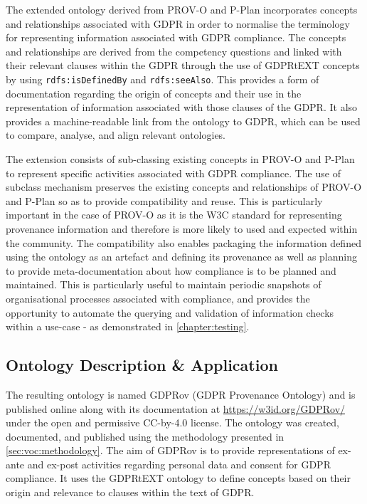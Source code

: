 The extended ontology derived from PROV-O and P-Plan incorporates concepts and relationships associated with GDPR in order to normalise the terminology for representing information associated with GDPR compliance.
The concepts and relationships are derived from the competency questions and linked with their relevant clauses within the GDPR through the use of GDPRtEXT concepts by using \texttt{rdfs:isDefinedBy} and \texttt{rdfs:seeAlso}.
This provides a form of documentation regarding the origin of concepts and their use in the representation of information associated with those clauses of the GDPR.
It also provides a machine-readable link from the ontology to GDPR, which can be used to compare, analyse, and align relevant ontologies.

The extension consists of sub-classing existing concepts in PROV-O and P-Plan to represent specific activities associated with GDPR compliance. 
The use of subclass mechanism preserves the existing concepts and relationships of PROV-O and P-Plan so as to provide compatibility and reuse. This is particularly important in the case of PROV-O as it is the W3C standard for representing provenance information and therefore is more likely to used and expected within the community.
The compatibility also enables packaging the information defined using the ontology as an artefact and defining its provenance as well as planning to provide meta-documentation about how compliance is to be planned and maintained. This is particularly useful to maintain periodic snapshots of organisational processes associated with compliance, and provides the opportunity to automate the querying and validation of information checks within a use-case - as demonstrated in \autoref{chapter:testing}.

\subsection{Ontology Description \& Application}
The resulting ontology is named GDPRov (GDPR Provenance Ontology) and is published online along with its documentation at \url{https://w3id.org/GDPRov/} under the open and permissive CC-by-4.0 license.
The ontology was created, documented, and published using the methodology presented in \autoref{sec:voc:methodology}.
The aim of GDPRov is to provide representations of ex-ante and ex-post activities regarding personal data and consent for GDPR compliance.
It uses the GDPRtEXT ontology to define concepts based on their origin and relevance to clauses within the text of GDPR.

